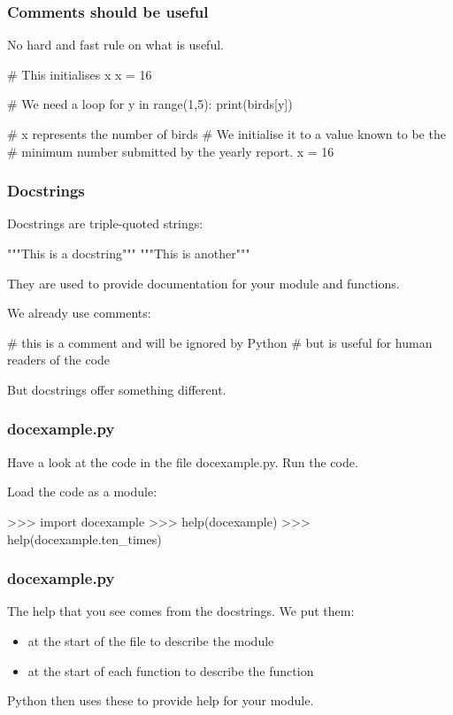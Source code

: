 \documentclass{beamer}
\begin{document}
\begin{frame}[fragile]
\frametitle{Comments should be useful}
No hard and fast rule on what is useful.
\begin{code}
# This initialises x
x = 16

# We need a loop
for y in range(1,5):
   print(birds[y])
\end{code}

\bigskip

\begin{code}
# x represents the number of birds
# We initialise it to a value known to be the
# minimum number submitted by the yearly report.
x = 16
\end{code}
\end{frame}

\begin{frame}[fragile]
\frametitle{Docstrings}
Docstrings are triple-quoted strings:

\begin{code}
"""This is a docstring"""
"""This is another"""
\end{code}

They are used to provide documentation for your module and
functions.

We already use comments:

\begin{code}
# this is a comment and will be ignored by Python
# but is useful for human readers of the code
\end{code}

But docstrings offer something different.
\end{frame}

\begin{frame}[fragile]
\frametitle{docexample.py}
Have a look at the code in the file docexample.py.
Run the code.

\bigskip

Load the code as a module:
\begin{code}
>>> import docexample
>>> help(docexample)
>>> help(docexample.ten_times)
\end{code}
\end{frame}



\begin{frame}[fragile]
\frametitle{docexample.py}
The help that you see comes from the docstrings. We put
them:
\begin{itemize}
\item at the start of the file to describe the module
\item at the start of each function to describe the function
\end{itemize} 
Python then uses these to provide help for your module.

\end{frame}
\end{document}
